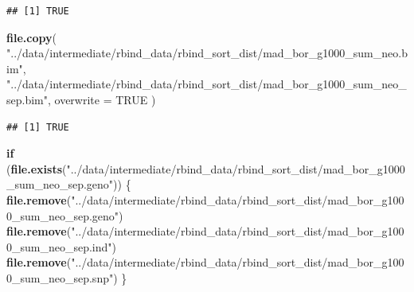 \documentclass[
]{article}
\newenvironment{Shaded}{\begin{snugshade}}{\end{snugshade}}
\newcommand{\AttributeTok}[1]{\textcolor[rgb]{0.13,0.29,0.53}{#1}}
\newcommand{\CommentTok}[1]{\textcolor[rgb]{0.56,0.35,0.01}{\textit{#1}}}
\newcommand{\ConstantTok}[1]{\textcolor[rgb]{0.56,0.35,0.01}{#1}}
\newcommand{\ControlFlowTok}[1]{\textcolor[rgb]{0.13,0.29,0.53}{\textbf{#1}}}
\newcommand{\FunctionTok}[1]{\textcolor[rgb]{0.13,0.29,0.53}{\textbf{#1}}}
\newcommand{\NormalTok}[1]{#1}
\newcommand{\OtherTok}[1]{\textcolor[rgb]{0.56,0.35,0.01}{#1}}
\newcommand{\SpecialCharTok}[1]{\textcolor[rgb]{0.81,0.36,0.00}{\textbf{#1}}}
\newcommand{\StringTok}[1]{\textcolor[rgb]{0.31,0.60,0.02}{#1}}
\begin{document}
\begin{Shaded}
\end{Shaded}

\begin{verbatim}
## [1] TRUE
\end{verbatim}

\begin{Shaded}
\begin{Highlighting}[]
\FunctionTok{file.copy}\NormalTok{(}
  \StringTok{"../data/intermediate/rbind\_data/rbind\_sort\_dist/mad\_bor\_g1000\_sum\_neo.bim"}\NormalTok{,}
  \StringTok{"../data/intermediate/rbind\_data/rbind\_sort\_dist/mad\_bor\_g1000\_sum\_neo\_sep.bim"}\NormalTok{,}
  \AttributeTok{overwrite =} \ConstantTok{TRUE}
\NormalTok{)}
\end{Highlighting}
\end{Shaded}

\begin{verbatim}
## [1] TRUE
\end{verbatim}

\begin{Shaded}
\begin{Highlighting}[]
\ControlFlowTok{if}\NormalTok{ (}\FunctionTok{file.exists}\NormalTok{(}\StringTok{"../data/intermediate/rbind\_data/rbind\_sort\_dist/mad\_bor\_g1000\_sum\_neo\_sep.geno"}\NormalTok{)) \{}
  \FunctionTok{file.remove}\NormalTok{(}\StringTok{"../data/intermediate/rbind\_data/rbind\_sort\_dist/mad\_bor\_g1000\_sum\_neo\_sep.geno"}\NormalTok{)}
  \FunctionTok{file.remove}\NormalTok{(}\StringTok{"../data/intermediate/rbind\_data/rbind\_sort\_dist/mad\_bor\_g1000\_sum\_neo\_sep.ind"}\NormalTok{)}
  \FunctionTok{file.remove}\NormalTok{(}\StringTok{"../data/intermediate/rbind\_data/rbind\_sort\_dist/mad\_bor\_g1000\_sum\_neo\_sep.snp"}\NormalTok{)}
\NormalTok{\}}
\end{Highlighting}
\end{Shaded}
\end{document}
